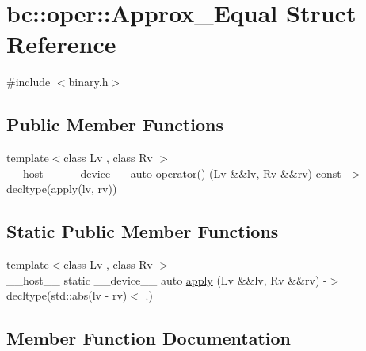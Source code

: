 \hypertarget{structbc_1_1oper_1_1Approx__Equal}{}\section{bc\+:\+:oper\+:\+:Approx\+\_\+\+Equal Struct Reference}
\label{structbc_1_1oper_1_1Approx__Equal}


{\ttfamily \#include $<$binary.\+h$>$}

\subsection*{Public Member Functions}
\begin{DoxyCompactItemize}
\item 
{\footnotesize template$<$class Lv , class Rv $>$ }\\\+\_\+\+\_\+host\+\_\+\+\_\+ \+\_\+\+\_\+device\+\_\+\+\_\+ auto \hyperlink{structbc_1_1oper_1_1Approx__Equal_ad46ea264a8158c151ae0d159a3d0ed52}{operator()} (Lv \&\&lv, Rv \&\&rv) const -\/$>$ decltype(\hyperlink{structbc_1_1oper_1_1Approx__Equal_a7eaf517f3b69b5171d7bc4cc863cfd9c}{apply}(lv, rv))
\end{DoxyCompactItemize}
\subsection*{Static Public Member Functions}
\begin{DoxyCompactItemize}
\item 
{\footnotesize template$<$class Lv , class Rv $>$ }\\\+\_\+\+\_\+host\+\_\+\+\_\+ static \+\_\+\+\_\+device\+\_\+\+\_\+ auto \hyperlink{structbc_1_1oper_1_1Approx__Equal_a7eaf517f3b69b5171d7bc4cc863cfd9c}{apply} (Lv \&\&lv, Rv \&\&rv) -\/$>$ decltype(std\+::abs(lv -\/ rv)$<$ .)
\end{DoxyCompactItemize}


\subsection{Member Function Documentation}
\mbox{\label{structbc_1_1oper_1_1Approx__Equal_a7eaf517f3b69b5171d7bc4cc863cfd9c}} 
